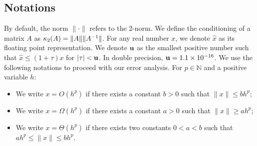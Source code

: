 \subsection{Notations}
By default, the norm $\|\cdot\|$ refers to the 2-norm.
We define the conditioning of a matrix $A$ as
$\kappa_2(A) = \| A \| \|A^{-1} \|$.
For any real number $x$, we denote $\widehat{x}$ as its floating
point representation.
We denote $\mathbf{u}$ as the smallest positive number such that
$\widehat{x} \leq (1 + \tau) x$ for $|\tau| < \mathbf{u}$.
In double precision, $\mathbf{u} = 1.1 \times 10^{-16}$.
We use the following notations to proceed with our error analysis.
For $p \in \mathbb{N}$ and a positive variable $h$:
\begin{itemize}
  \item We write $x = O(h^p)$ if there exists a constant $b > 0$
    such that $\| x \| \leq b h^p$;
  \item We write $x = \Omega(h^p)$ if there exists a constant $a > 0$
    such that $\| x \| \geq a h^p$;
  \item We write $x = \Theta(h^p)$ if there exists two constants $0 < a < b$
    such that $a h^p \leq \| x \| \leq b h^p$.
\end{itemize}
